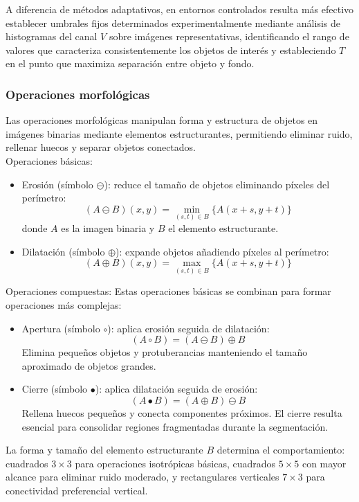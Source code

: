 A diferencia de métodos adaptativos, en entornos controlados resulta más efectivo establecer umbrales fijos determinados experimentalmente mediante análisis de histogramas del canal $V$ sobre imágenes representativas, identificando el rango de valores que caracteriza consistentemente los objetos de interés y estableciendo $T$ en el punto que maximiza separación entre objeto y fondo.

\subsubsection{Operaciones morfológicas}

Las operaciones morfológicas manipulan forma y estructura de objetos en imágenes binarias mediante elementos estructurantes, permitiendo eliminar ruido, rellenar huecos y separar objetos conectados.\\

Operaciones básicas:

\begin{itemize}[label=$\bullet$]
\item Erosión (símbolo $\ominus$): reduce el tamaño de objetos eliminando píxeles del perímetro:
\begin{equation}
(A \ominus B)(x,y) = \min_{(s,t) \in B} \{A(x+s, y+t)\}
\end{equation}
donde $A$ es la imagen binaria y $B$ el elemento estructurante.

\item Dilatación (símbolo $\oplus$): expande objetos añadiendo píxeles al perímetro:
\begin{equation}
(A \oplus B)(x,y) = \max_{(s,t) \in B} \{A(x+s, y+t)\}
\end{equation}
\end{itemize}

Operaciones compuestas:
\noindent
Estas operaciones básicas se combinan para formar operaciones más complejas:

\begin{itemize}[label=$\bullet$]
\item Apertura (símbolo $\circ$): aplica erosión seguida de dilatación:
\begin{equation}
(A \circ B) = (A \ominus B) \oplus B
\end{equation}
Elimina pequeños objetos y protuberancias manteniendo el tamaño aproximado de objetos grandes.

\item Cierre (símbolo $\bullet$): aplica dilatación seguida de erosión:
\begin{equation}
(A \bullet B) = (A \oplus B) \ominus B
\end{equation}
Rellena huecos pequeños y conecta componentes próximos. El cierre resulta esencial para consolidar regiones fragmentadas durante la segmentación. \\
\end{itemize}
La forma y tamaño del elemento estructurante $B$ determina el comportamiento: cuadrados $3 \times 3$ para operaciones isotrópicas básicas, cuadrados $5 \times 5$ con mayor alcance para eliminar ruido moderado, y rectangulares verticales $7 \times 3$ para conectividad preferencial vertical.


